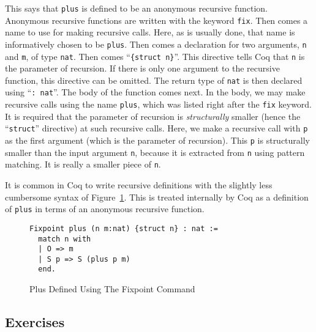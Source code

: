 \documentclass{book}[12pt]
\begin{document}
\noindent This says that \texttt{plus} is defined to be an anonymous
recursive function.  Anonymous recursive functions are written with
the keyword \texttt{fix}.  Then comes a name to use for making
recursive calls.  Here, as is usually done, that name is informatively
chosen to be \texttt{plus}.  Then comes a declaration for two
arguments, \texttt{n} and \texttt{m}, of type \texttt{nat}.  Then
comes ``\texttt{\{struct n\}}''.  This directive tells Coq that
\texttt{n} is the parameter of recursion.  If there is only one
argument to the recursive function, this directive can be omitted.
The return type of \texttt{nat} is then declared using ``\texttt{:
nat}''.  The body of the function comes next.  In the body, we may
make recursive calls using the name \texttt{plus}, which was listed
right after the \texttt{fix} keyword.  It is required that the
parameter of recursion is \emph{structurally} smaller (hence the
``\texttt{struct}'' directive) at such recursive calls.  Here, we make
a recursive call with \texttt{p} as the first argument (which is the
parameter of recursion).  This \texttt{p} is structurally smaller than
the input argument \texttt{n}, because it is extracted from \texttt{n}
using pattern matching.  It is really a smaller piece of \texttt{n}.

It is common in Coq to write recursive definitions with the slightly
less cumbersome syntax of Figure~\ref{fig:fixplus}.  This is treated
internally by Coq as a definition of \texttt{plus} in terms of an
anonymous recursive function.

\begin{figure}
\begin{verbatim}
Fixpoint plus (n m:nat) {struct n} : nat :=
  match n with
  | O => m
  | S p => S (plus p m)
  end.
\end{verbatim}
\caption{\label{fig:fixplus}Plus Defined Using The Fixpoint Command}
\end{figure}


\subsection{Exercises}
\end{document}
